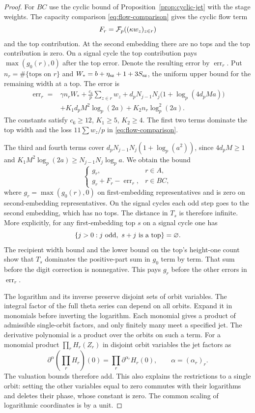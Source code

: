 \begin{proof}
For \(BC\) use the cyclic bound of
Proposition~\ref{prop:cyclic-jet} with the stage weights.
The capacity comparison \eqref{eq:flow-comparison} gives
the cyclic flow term 
\[
  F_r={\cal F}_p((\kappa w_z)_{z\in r})
\]
and the top contribution. At the second embedding there
are no tops and the top contribution is zero. On a signal
cycle the top contribution pays \(\max(g_0(r),0)\) after
the top error. Denote the resulting error by
\(\operatorname{err}_r\). Put \(n_r=\#\{\text{tops on }r\}\)
and \(W_*=b+\eta_{\rm sz}+1+3S_{\rm sz}\), the uniform
upper bound for the remaining width at a top. The error is
\[
 \begin{split}
 \operatorname{err}_r={}&\gamma n_r W_*+
  \frac{c_6}{p}\sum_{z\in r}w_z+
  d_p N_{j-1}N_j\bigl(1+\log_p(4d_p M a)\bigr)\\
 &+K_1d_p M^2\log_p(2a)+K_2 n_r\log_p^2(2a).
 \end{split}
\]
The constants satisfy \(c_6\ge12\), \(K_1\ge5\),
\(K_2\ge4\). The first two terms dominate
the top width and the loss \(11\sum w_z/p\) in
\eqref{eq:flow-comparison}.

The third and fourth terms cover
\(d_p N_{j-1}N_j(1+\log_p(a^2))\), since \(4d_pM\ge1\)
and \(K_1 M^2\log_p(2a)\ge N_{j-1}N_j\log_p a\).
We obtain the bound
\[
  \begin{cases}
    g_r, &r\in A,\\
    g_r+F_r-\operatorname{err}_r, &r\in BC,
  \end{cases}
\]
where \(g_r=\max(g_0(r),0)\) on first-embedding representatives
and is zero on second-embedding representatives. On the signal
cycles each odd step goes to the second embedding, which has
no tops. The distance in \(T_s\) is therefore infinite.
More explicitly, for any first-embedding top \(s\) on a signal cycle one has
\[
  \{j>0:j\ {\rm odd},\ s+j\text{ is a top}\}=\varnothing .
\]
The recipient width bound and the lower bound on the top's
height-one count show that \(T_s\) dominates the positive-part
sum in \(g_0\) term by term. That sum before the digit correction
is nonnegative. This pays \(g_r\) before the other errors in
\(\operatorname{err}_r\).


The logarithm and its inverse preserve disjoint sets of orbit
variables. The integral factor of the full theta series can
depend on all orbits. Expand it in monomials before inverting
the logarithm. Each monomial gives a product of admissible
single-orbit factors, and only finitely many meet a specified
jet. The derivative polynomial is a product over the orbits
on such a term.
For a monomial product \(\prod_r H_r(Z_r)\) in disjoint orbit variables the jet factors as
\[
  \partial^\alpha\!\left(\prod_r H_r\right)(0)=\prod_r\partial^{\alpha_r}H_r(0),\qquad\alpha=(\alpha_r)_r.
\]
 The valuation bounds therefore add. This
also explains the restrictions to a single orbit: setting the
other variables equal to zero commutes with their logarithms
and deletes their phase, whose constant is zero. The common
scaling of logarithmic coordinates is by a unit.


\end{proof}
